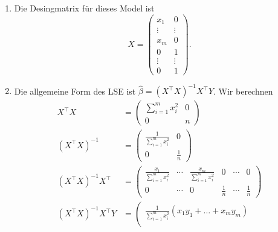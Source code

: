 \solution
\begin{enumerate}
    \item Die Desingmatrix für dieses Model ist
            \begin{equation*}
                X = \left(
                \begin{array}{cc}
                    x_1 & 0 \\
                    \vdots & \vdots \\
                    x_m & 0 \\
                    0 & 1 \\
                    \vdots & \vdots \\
                    0 & 1 
                \end{array}
                \right).
            \end{equation*}
        \item Die allgemeine Form des LSE ist 
            $\hat \beta = \left( X^\top X \right)^{-1} X^\top Y$. Wir berechnen
            \begin{align*}
                X^\top X &= \left(
                \begin{array}{cc}
                    \sum_{i=1}^{m} x_i^2 & 0 \\
                    0 & n 
                \end{array}
                \right) \\
                \left( X^\top X \right)^{-1} &= \left(
                \begin{array}{cc}
                    \frac{1}{\sum_{i=1}^{m} x_i^2} & 0 \\
                    0 & \frac{1}{n} 
                \end{array}
                \right) \\
                \left( X^\top X \right)^{-1} X^\top &= \left(
                \begin{array}{cccccc}
                    \frac{x_1}{\sum_{i=1}^{m} x_i^2} & \cdots & \frac{x_m}{\sum_{i=1}^{m} x_i^2} & 
                        0 & \cdots & 0 \\
                        0& \cdots &0& \frac{1}{n} & \cdots & \frac{1}{n} 
                \end{array}
                \right) \\
                \left( X^\top X \right)^{-1} X^\top Y &= 
                \left(
                \begin{array}{c}
                    \frac{1}{\sum_{i=1}^{m} x_i^2} \left( x_1 y_1 + \ldots + x_m y_m \right)  \\

\end{array}
\end{align*}
\end{enumerate}
